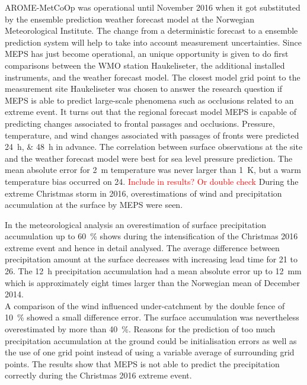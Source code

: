 \par\medskip
\noindent
AROME-MetCoOp was operational until November 2016 when it got substituted by the ensemble prediction weather forecast model at the Norwegian Meteorological Institute. The change from a deterministic forecast to a ensemble prediction system will help to take into account measurement uncertainties. 
Since MEPS has just become operational, an unique opportunity is given to do first comparisons between the WMO station Haukeliseter, the additional installed instruments, and the weather forecast model.
The closest model grid point to the measurement site Haukeliseter was chosen to answer the research question if MEPS is able to predict large-scale phenomena such as occlusions related to an extreme event.
It turns out that the regional forecast model MEPS is capable of predicting changes associated to frontal passages and occlusions. 
Pressure, temperature, and wind changes associated with passages of fronts were predicted \SIlist{24;48}{\hour} in advance. The correlation between surface observations at the site and the weather forecast model were best for sea level pressure prediction. The mean absolute error for \SI{2}{\metre} temperature was never larger than \SI{1}{\kelvin}, but a warm temperature bias occurred on \SI{24}{\dec}. \textcolor{red}{Include in results? Or double check}
During the extreme Christmas storm in 2016, overestimations of wind and precipitation accumulation at the surface by MEPS were seen. 
\par\medskip
\noindent
In the meteorological analysis an overestimation of surface precipitation accumulation up to \SI{60}{\percent} shows during the intensification of the Christmas 2016 extreme event and hence in detail analysed. The average difference between precipitation amount at the surface decreases with increasing lead time for \num{21} to \SI{26}{\dec}. The \SI{12}{\hour} precipitation accumulation had a mean absolute error up to \SI{12}{\mm} which is approximately eight times larger than the Norwegian mean of December 2014.
\\
A comparison of the wind influenced under-catchment by the double fence of \SI{10}{\percent} showed a small difference error. The surface accumulation was nevertheless overestimated by more than \SI{40}{\percent}. Reasons for the prediction of too much precipitation accumulation at the ground could be initialisation errors as well as the use of one grid point instead of using a variable average of surrounding grid points. The results show that MEPS is not able to predict the precipitation correctly during the Christmas 2016 extreme event. 
